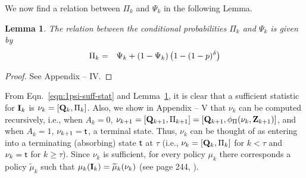 \documentclass[acmtosn]{acmtrans2m}
\newtheorem{lemma}{Lemma}
\begin{document}
We now find a relation between $\Pi_k$ and $\Psi_k$ in the following
Lemma.
\begin{lemma}
\label{lemma}
The relation between the conditional probabilities 
$\Pi_k$ and $\Psi_k$ is given by
\begin{eqnarray}
\label{eqn:psi-theta}
\Pi_k & = & \hspace{-0mm} \Psi_k + (1-\Psi_k)\left(1 - (1-p)^{\delta}\right)
\end{eqnarray}
\end{lemma}

\begin{proof}
See Appendix -- IV.
\end{proof}

From 
Eqn.~\ref{eqn:1psi-suff-stat} and
Lemma~\ref{lemma}, it is clear that a sufficient statistic for 
${\bf I}_k$ is $\nu_k = [{\bf Q}_k, \Pi_k]$. Also, we show in 
Appendix -- V that $\nu_k$ can be computed recursively,
i.e., when $A_k = 0$, $\nu_{k+1} = \left[{\bf Q}_{k+1}, \Pi_{k+1}\right]
= \left[{\bf Q}_{k+1}, \phi_{\Pi}(\nu_k,{\bf Z}_{k+1})\right]$, 
and when $A_k = 1$, $\nu_{k+1} = {\sf t}$, a terminal state. 
Thus, $\nu_k$ can be thought of as entering into a terminating (absorbing) state 
${\sf t}$ at $\tau$ (i.e., $\nu_k = [{\bf Q}_k, \Pi_k]$ for $k < \tau$ and 
$\nu_k = {\sf t}$ for $k \geqslant \tau$). Since $\nu_k$ is sufficient, 
for every policy $\mu_k$ there corresponds a policy 
$\widetilde{\mu}_k$ such that  
$\mu_k({\bf I}_k) = \widetilde{\mu}_k(\nu_k)$ 
(see page 244, \cite{books.bertsekas00a}).
\end{document}
